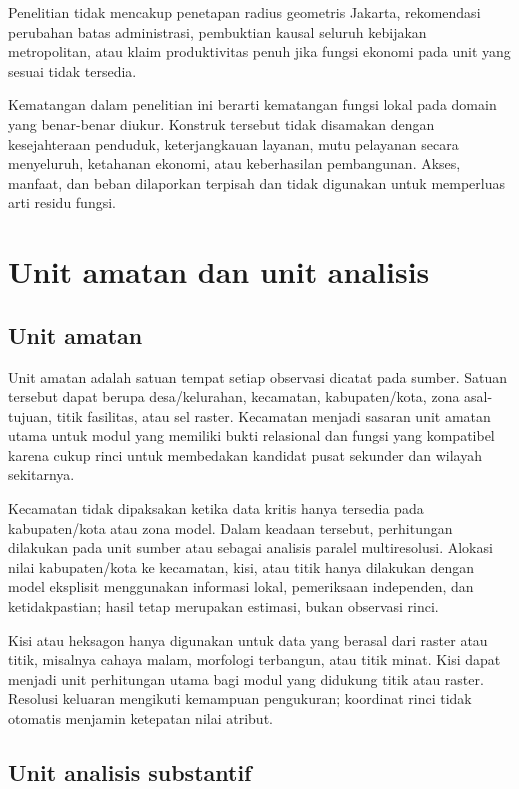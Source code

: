 \documentclass[11pt,a4paper,oneside,openany,indonesian]{report}
\begin{document}
Penelitian tidak mencakup penetapan radius geometris Jakarta,
rekomendasi perubahan batas administrasi, pembuktian kausal seluruh
kebijakan metropolitan, atau klaim produktivitas penuh jika fungsi
ekonomi pada unit yang sesuai tidak tersedia.

Kematangan dalam penelitian ini berarti kematangan fungsi lokal pada
domain yang benar-benar diukur. Konstruk tersebut tidak disamakan dengan
kesejahteraan penduduk, keterjangkauan layanan, mutu pelayanan secara
menyeluruh, ketahanan ekonomi, atau keberhasilan pembangunan. Akses,
manfaat, dan beban dilaporkan terpisah dan tidak digunakan untuk
memperluas arti residu fungsi.

\section{Unit amatan dan unit
analisis}\label{unit-amatan-dan-unit-analisis}

\subsection{Unit amatan}\label{unit-amatan}

Unit amatan adalah satuan tempat setiap observasi dicatat pada sumber.
Satuan tersebut dapat berupa desa/kelurahan, kecamatan, kabupaten/kota,
zona asal-tujuan, titik fasilitas, atau sel raster. Kecamatan menjadi
sasaran unit amatan utama untuk modul yang memiliki bukti relasional dan
fungsi yang kompatibel karena cukup rinci untuk membedakan kandidat
pusat sekunder dan wilayah sekitarnya.

Kecamatan tidak dipaksakan ketika data kritis hanya tersedia pada
kabupaten/kota atau zona model. Dalam keadaan tersebut, perhitungan
dilakukan pada unit sumber atau sebagai analisis paralel multiresolusi.
Alokasi nilai kabupaten/kota ke kecamatan, kisi, atau titik hanya
dilakukan dengan model eksplisit menggunakan informasi lokal, pemeriksaan
independen, dan ketidakpastian; hasil tetap merupakan estimasi, bukan
observasi rinci.

Kisi atau heksagon hanya digunakan untuk data yang berasal dari raster
atau titik, misalnya cahaya malam, morfologi terbangun, atau titik
minat. Kisi dapat menjadi unit perhitungan utama bagi modul yang
didukung titik atau raster. Resolusi keluaran mengikuti kemampuan
pengukuran; koordinat rinci tidak otomatis menjamin ketepatan nilai
atribut.

\subsection{Unit analisis
substantif}\label{unit-analisis-substantif}
\end{document}
